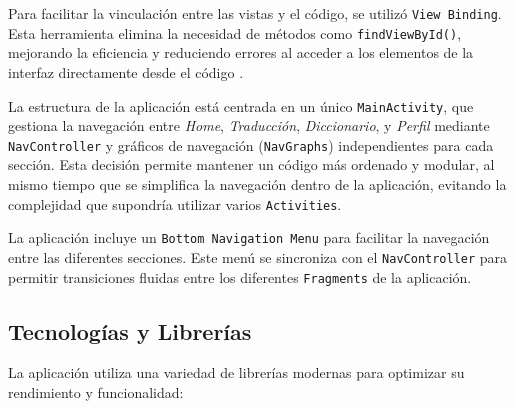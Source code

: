 Para facilitar la vinculación entre las vistas y el código, se utilizó \texttt{View Binding}. Esta herramienta elimina la necesidad de métodos como \texttt{findViewById()}, mejorando la eficiencia y reduciendo errores al acceder a los elementos de la interfaz directamente desde el código \cite{Ozaltun2022}.

La estructura de la aplicación está centrada en un único \texttt{MainActivity}, que gestiona la navegación entre \textit{Home}, \textit{Traducción}, \textit{Diccionario}, y \textit{Perfil} mediante \texttt{NavController} y gráficos de navegación (\texttt{NavGraphs}) independientes para cada sección. Esta decisión permite mantener un código más ordenado y modular, al mismo tiempo que se simplifica la navegación dentro de la aplicación, evitando la complejidad que supondría utilizar varios \texttt{Activities}.

La aplicación incluye un \texttt{Bottom Navigation Menu} para facilitar la navegación entre las diferentes secciones. Este menú se sincroniza con el \texttt{NavController} para permitir transiciones fluidas entre los diferentes \texttt{Fragments} de la aplicación.


\subsection{Tecnologías y Librerías}

La aplicación utiliza una variedad de librerías modernas para optimizar su rendimiento y funcionalidad:

